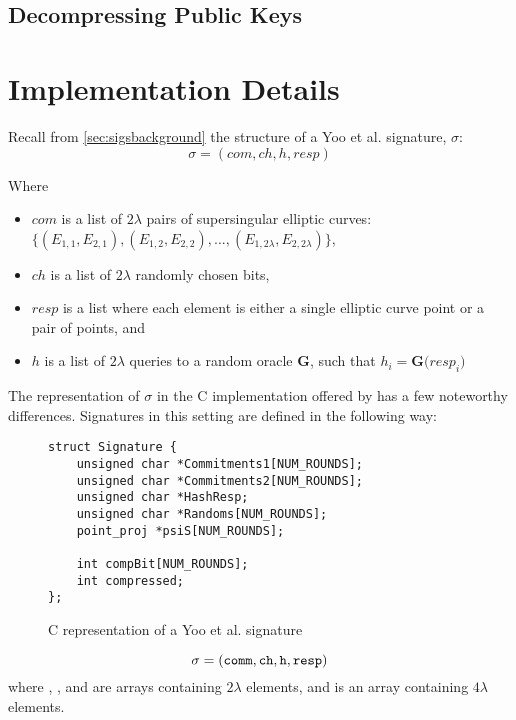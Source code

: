 \subsection{Decompressing Public Keys}


\section{Implementation Details}
\label{sec:compimplementation}

Recall from \ref{sec:sigsbackground} the structure of a Yoo et al. signature, $\sigma$:
$$
\sigma = (com, ch, h, resp)
$$

\noindent
Where

\begin{itemize}
\item $com$ is a list of $2\lambda$ pairs of supersingular elliptic curves: $\{(E_{1,1}, E_{2,1}), (E_{1,2}, E_{2,2}), ..., (E_{1,2\lambda}, E_{2,2\lambda})\}$,
\item $ch$ is a list of $2\lambda$ randomly chosen bits,
\item $resp$ is a list where each element is either a single elliptic curve point or a pair of points, and
\item $h$ is a list of $2\lambda$ queries to a random oracle \textbf{G}, such that $h_{i} = \textbf{G(}resp_{i}\textbf{)}$
\end{itemize}

The representation of $\sigma$ in the C implementation offered by \cite{yoo} has a few noteworthy differences. Signatures in this setting are defined in the following way:
\begin{figure}[!h]
\begin{lstlisting}
struct Signature {
	unsigned char *Commitments1[NUM_ROUNDS];
	unsigned char *Commitments2[NUM_ROUNDS];
	unsigned char *HashResp;
	unsigned char *Randoms[NUM_ROUNDS];
	point_proj *psiS[NUM_ROUNDS];

	int compBit[NUM_ROUNDS];
	int compressed;
};
\end{lstlisting}
\caption{C representation of a Yoo et al. signature}
\label{code:sigstruct}
\end{figure}

$$
\sigma = (\texttt{comm}, \texttt{ch}, \texttt{h}, \texttt{resp})
$$
where , , and  are arrays containing $2\lambda$ elements, and  is an array containing $4\lambda$ elements. 

